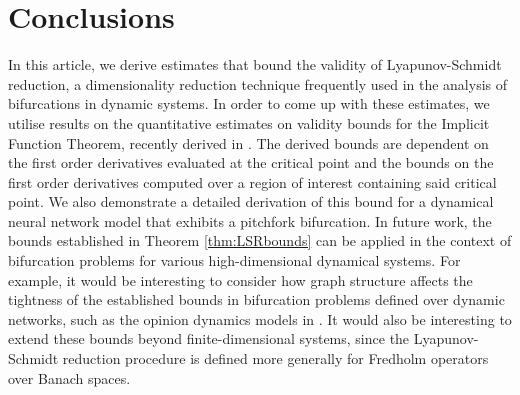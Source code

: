 \documentclass[letterpaper, 10 pt, conference, dvipsnames]{ieeeconf}
\begin{document}
\section{Conclusions \label{sec:conclusion}}
\label{cnclsn}
In this article, we derive estimates that bound the validity of Lyapunov-Schmidt reduction, a dimensionality reduction technique frequently used in the analysis of bifurcations in dynamic systems. In order to come up with these estimates, we utilise results on the quantitative estimates on validity bounds for the Implicit Function Theorem, recently derived in \cite{jindal2023imft}. The derived bounds are dependent on the first order derivatives evaluated at the critical point and the bounds on the first order derivatives computed over a region of interest containing said critical point. We also demonstrate a detailed derivation of this bound for a dynamical neural network model that exhibits a pitchfork bifurcation. In future work, the bounds established in Theorem \ref{thm:LSRbounds} can be applied in the context of bifurcation problems for various high-dimensional dynamical systems. For example, it would be interesting to consider how graph structure affects the tightness of the established bounds in bifurcation problems defined over dynamic networks, such as the opinion dynamics models in \cite{bizyaeva2022nonlinear,bizyaeva2023thesis}. It would also be interesting to extend these bounds beyond finite-dimensional systems, since the Lyapunov-Schmidt reduction procedure is defined more generally for Fredholm operators over Banach spaces.




\end{document}
